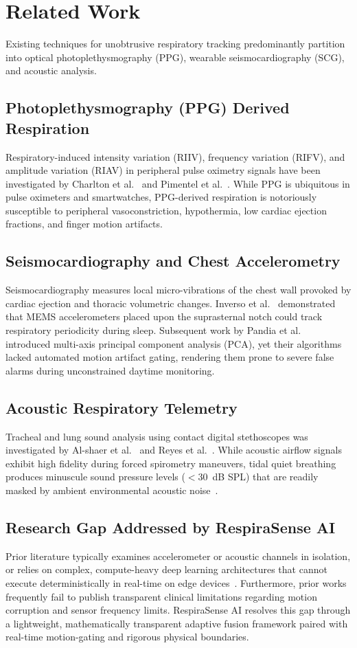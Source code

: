 \documentclass[journal]{IEEEtran}
\begin{document}
\section{Related Work}
Existing techniques for unobtrusive respiratory tracking predominantly partition into optical photoplethysmography (PPG), wearable seismocardiography (SCG), and acoustic analysis.

\subsection{Photoplethysmography (PPG) Derived Respiration}
Respiratory-induced intensity variation (RIIV), frequency variation (RIFV), and amplitude variation (RIAV) in peripheral pulse oximetry signals have been investigated by Charlton et al.~\cite{charlton2018} and Pimentel et al.~\cite{pimentel2015}. While PPG is ubiquitous in pulse oximeters and smartwatches, PPG-derived respiration is notoriously susceptible to peripheral vasoconstriction, hypothermia, low cardiac ejection fractions, and finger motion artifacts.

\subsection{Seismocardiography and Chest Accelerometry}
Seismocardiography measures local micro-vibrations of the chest wall provoked by cardiac ejection and thoracic volumetric changes. Inverso et al.~\cite{inverso2018} demonstrated that MEMS accelerometers placed upon the suprasternal notch could track respiratory periodicity during sleep. Subsequent work by Pandia et al.~\cite{pandia2019} introduced multi-axis principal component analysis (PCA), yet their algorithms lacked automated motion artifact gating, rendering them prone to severe false alarms during unconstrained daytime monitoring.

\subsection{Acoustic Respiratory Telemetry}
Tracheal and lung sound analysis using contact digital stethoscopes was investigated by Al-shaer et al.~\cite{alshaer2020} and Reyes et al.~\cite{reyes2014}. While acoustic airflow signals exhibit high fidelity during forced spirometry maneuvers, tidal quiet breathing produces minuscule sound pressure levels ($< 30$~dB SPL) that are readily masked by ambient environmental acoustic noise~\cite{almously2019}.

\subsection{Research Gap Addressed by RespiraSense AI}
Prior literature typically examines accelerometer or acoustic channels in isolation, or relies on complex, compute-heavy deep learning architectures that cannot execute deterministically in real-time on edge devices~\cite{hannun2019}. Furthermore, prior works frequently fail to publish transparent clinical limitations regarding motion corruption and sensor frequency limits. RespiraSense AI resolves this gap through a lightweight, mathematically transparent adaptive fusion framework paired with real-time motion-gating and rigorous physical boundaries.
\end{document}
